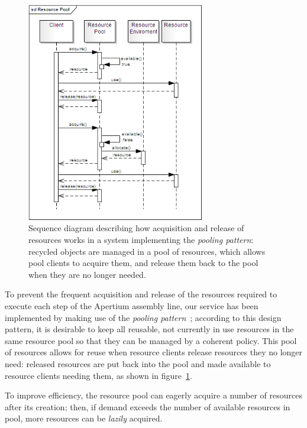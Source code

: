 \documentclass[11pt]{article}
\begin{document}
\begin{figure}[!ht]
\begin{center}
\includegraphics[width=7.75cm]{resource_pool}
\end{center}
\caption{Sequence diagram describing how acquisition and release of resources works in a 
  system implementing the \emph{pooling pattern}: recycled objects are managed in a pool of 
  resources, which allows pool clients to acquire them, and release them back to the pool 
  when they are no longer needed.}
\label{fig:rp}
\end{figure}

To prevent the frequent acquisition and release of the resources required to execute each step 
of the Apertium assembly line, our service has been implemented by making use of 
the \emph{pooling pattern}~\citep{kircher2001}; according to this design pattern, it is desirable 
to keep all reusable, not currently in use resources in the same resource pool so that they can 
be managed by a coherent policy.
This pool of resources allows for reuse when resource clients release resources they no longer 
need: released resources are put back into the pool and made available to resource clients needing 
them, as shown in figure~\ref{fig:rp}.

To improve efficiency, the resource pool can eagerly acquire a number of resources after its 
creation; then, if demand exceeds the number of available resources in pool, more resources 
can be \emph{lazily} acquired.
\end{document}
